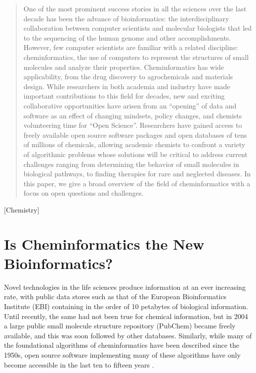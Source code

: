 \documentclass{sig-alternate}
\begin{document}
\maketitle
\begin{abstract}
  One of the most prominent success stories in all the sciences over
  the last decade has been the advance of bioinformatics: the
  interdisciplinary collaboration between computer scientists and
  molecular biologists that led to the
  sequencing of the human genome and other accomplishments. However,
  few computer scientists are familiar
  with a related discipline: cheminformatics, the use of computers to
  represent the structures of small molecules and analyze their
  properties.  Cheminformatics has wide applicability, from the
  drug discovery to agrochemicals and materials design.
  While researchers in both academia and industry have made important
  contributions to this field for decades, new and
  exciting collaborative opportunities have arisen from an ``opening'' of
  data and software as an effect of changing mindsets,
  policy changes,
  and chemists volunteering time
  for ``Open Science''.  Researchers have gained access to
  freely available open source software packages and open databases of tens of millions
  of chemicals, allowing academic chemists to confront a variety of
  algorithmic problems whose solutions will be critical to address
  current challenges ranging from
  determining the behavior of small molecules in biological pathways,
  to finding therapies for rare and neglected diseases.
  In this paper, we give a broad overview of the field of cheminformatics with a
  focus on open questions and challenges.
\end{abstract}

[Chemistry]

\section{Is Cheminformatics the New \\Bioinformatics?}

Novel technologies in the life sciences produce information at an
ever increasing rate, with public data stores such as that of the
European Bioinformatics Institute (EBI) containing in the order of 10
petabytes of biological information.  Until recently, the same
had not been true for
chemical information, but in 2004 a
large public small molecule structure repository (PubChem) became
freely available, and this was soon followed by other databases.
Similarly, while many of
the foundational algorithms of cheminformatics have been described
since the 1950s, open source software implementing many of
these algorithms have only become accessible in the last ten to fifteen
years \cite{faulon2010}.
\end{document}
